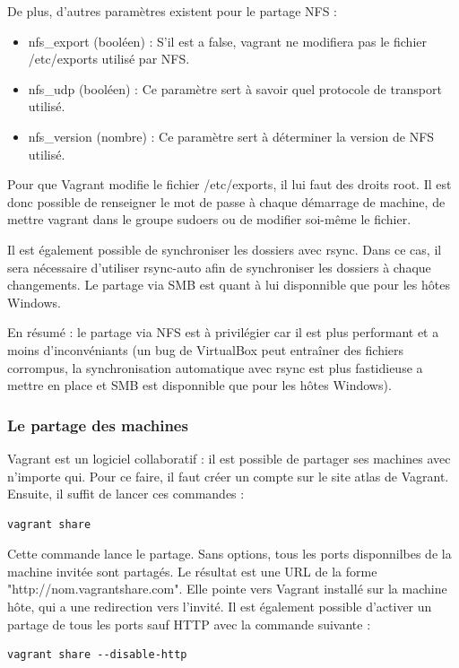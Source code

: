 \documentclass[12pt,a4paper]{article}
\begin{document}
De plus, d'autres paramètres existent pour le partage NFS : 
\begin{itemize}
	\item{nfs\_export (booléen) : S'il est a false, vagrant ne modifiera pas le fichier /etc/exports utilisé par NFS.}
	\item{nfs\_udp (booléen) : Ce paramètre sert à savoir quel protocole de transport utilisé.}
	\item{nfs\_version (nombre) : Ce paramètre sert à déterminer la version de NFS utilisé.}
\end{itemize}
Pour que Vagrant modifie le fichier /etc/exports, il lui faut des droits root. Il est donc possible de renseigner le mot de passe à chaque démarrage de machine, de mettre vagrant dans le groupe sudoers ou de modifier soi-même le fichier.

Il est également possible de synchroniser les dossiers avec rsync. Dans ce cas, il sera nécessaire d'utiliser rsync-auto afin de synchroniser les dossiers à chaque changements. Le partage via SMB est quant à lui disponnible que pour les hôtes Windows. 

En résumé : le partage via NFS est à privilégier car il est plus performant et a moins d'inconvéniants (un bug de VirtualBox peut entraîner des fichiers corrompus, la synchronisation automatique avec rsync est plus fastidieuse a mettre en place et SMB est disponnible que pour les hôtes Windows).

\subsubsection{Le partage des machines}
Vagrant est un logiciel collaboratif : il est possible de partager ses machines avec n'importe qui. Pour ce faire, il faut créer un compte sur le site atlas de Vagrant. Ensuite, il suffit de lancer ces commandes :
\begin{lstlisting}
vagrant share
\end{lstlisting}

Cette commande lance le partage. Sans options, tous les ports disponnilbes de la machine invitée sont partagés. Le résultat est une URL de la forme "http://nom.vagrantshare.com". Elle pointe vers Vagrant installé sur la machine hôte, qui a une redirection vers l'invité. Il est également possible d'activer un partage de tous les ports sauf HTTP avec la commande suivante :
\begin{lstlisting}
vagrant share --disable-http
\end{lstlisting}
\end{document}
